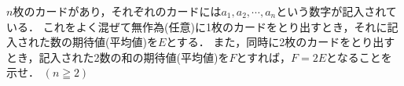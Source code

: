 \documentclass[../../main.tex]{subfiles}
\begin{document}
$n$枚のカードがあり，それぞれのカードには$a_1,a_2,\cdots,a_n$という数字が記入されている．
これをよく混ぜて無作為(任意)に1枚のカードをとり出すとき，それに記入された数の期待値(平均値)を$E$とする．
また，同時に2枚のカードをとり出すとき，記入された2数の和の期待値(平均値)を$F$とすれば，$F=2E$となることを示せ．
$(n\geqq2)$
\end{document}
